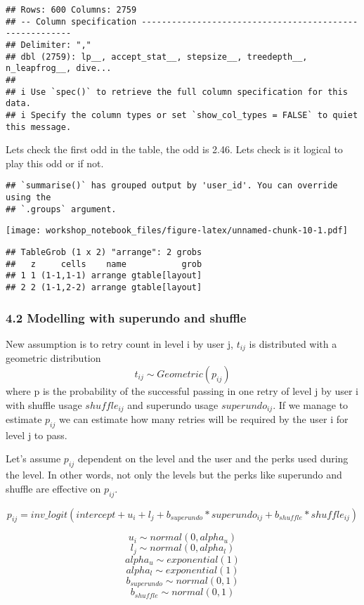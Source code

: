 \documentclass[
]{article}
\begin{document}
\begin{verbatim}
## Rows: 600 Columns: 2759
## -- Column specification --------------------------------------------------------
## Delimiter: ","
## dbl (2759): lp__, accept_stat__, stepsize__, treedepth__, n_leapfrog__, dive...
## 
## i Use `spec()` to retrieve the full column specification for this data.
## i Specify the column types or set `show_col_types = FALSE` to quiet this message.
\end{verbatim}

Lets check the first odd in the table, the odd is 2.46. Lets check is it
logical to play this odd or if not.

\begin{verbatim}
## `summarise()` has grouped output by 'user_id'. You can override using the
## `.groups` argument.
\end{verbatim}

\texttt{[image: workshop\_notebook\_files/figure-latex/unnamed-chunk-10-1.pdf]}

\begin{verbatim}
## TableGrob (1 x 2) "arrange": 2 grobs
##   z     cells    name           grob
## 1 1 (1-1,1-1) arrange gtable[layout]
## 2 2 (1-1,2-2) arrange gtable[layout]
\end{verbatim}

\hypertarget{modelling-with-superundo-and-shuffle}{%
\subsubsection{4.2 Modelling with superundo and
shuffle}\label{modelling-with-superundo-and-shuffle}}

New assumption is to retry count in level i by user j, \(t_{ij}\) is
distributed with a geometric distribution
\[  t_{ij} \sim Geometric (p_{ij}) \] where p is the probability of the
successful passing in one retry of level j by user i with shuffle usage
\(shuffle_{ij}\) and superundo usage \(superundo_{ij}\). If we manage to
estimate \(p_{ij}\) we can estimate how many retries will be required by
the user i for level j to pass.

Let's assume \(p_{ij}\) dependent on the level and the user and the
perks used during the level. In other words, not only the levels but the
perks like superundo and shuffle are effective on \(p_{ij}\).

\[  p_{ij} = inv\_logit(intercept + u_i + l_j + b_{superundo} * superundo_{ij}+ b_{shuffle} *shuffle_{ij}) \]

\[  u_i \sim normal (0, alpha_u) \] \[  l_j \sim normal (0, alpha_l) \]
\[  alpha_u \sim exponential (1) \] \[  alpha_l \sim exponential (1) \]
\[  b_{superundo} \sim normal (0, 1) \]
\[  b_{shuffle} \sim normal (0, 1) \]
\end{document}
